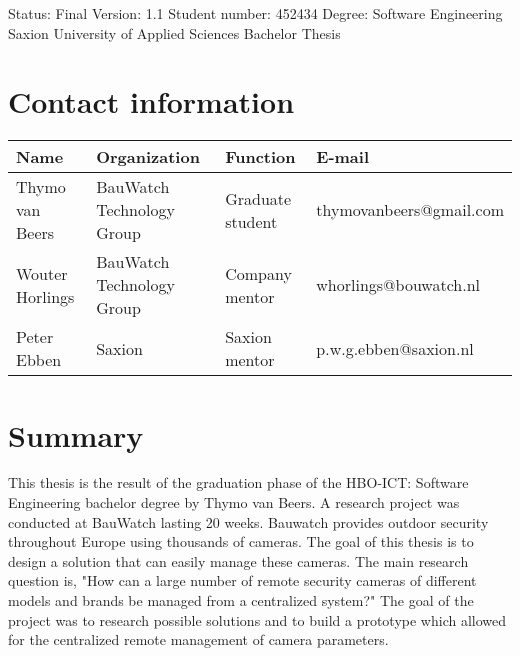 \begin{titlepage} 
\maketitle
\vspace*{\fill}
Status: Final\newline
Version: 1.1\newline
Student number: 452434\newline
Degree: Software Engineering\newline
Saxion University of Applied Sciences\newline
Bachelor Thesis
\thispagestyle{empty}
\end{titlepage}

\chapter*{Contact information}
\begin{center}
\begin{tabular}{ | m{8em} | m{8em} | m{8em} | m{11.1em} | }
\hline
\textbf{Name} & \textbf{Organization} & \textbf{Function} & \textbf{E-mail}
\\ \hline
Thymo van Beers & BauWatch Technology Group & Graduate student & thymovanbeers@gmail.com
\\ \hline
Wouter Horlings & BauWatch Technology Group & Company mentor & whorlings@bouwatch.nl
\\ \hline
Peter Ebben & Saxion & Saxion mentor & p.w.g.ebben@saxion.nl
\\ \hline
\end{tabular}
\end{center}

\thispagestyle{empty}
\chapter*{Summary}
This thesis is the result of the graduation phase of the HBO-ICT: Software Engineering bachelor degree by Thymo van Beers.
A research project was conducted at BauWatch lasting 20 weeks.
Bauwatch provides outdoor security throughout Europe using thousands of cameras.
The goal of this thesis is to design a solution that can easily manage these cameras.
The main research question is, "How can a large number of remote security cameras of different models and brands be managed from a centralized system?"
The goal of the project was to research possible solutions and to build a prototype which allowed for the centralized remote management of camera parameters.

